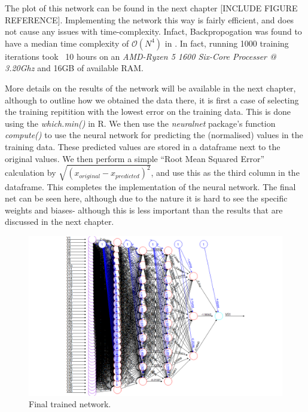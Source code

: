 The plot of this network can be found in the next chapter [INCLUDE FIGURE REFERENCE]. Implementing the network this way is fairly efficient, and does not cause any issues with time-complexity. Infact, Backpropogation 
was found to have a median time complexity of $\mathcal{O}(N^4)$ in \cite{lister}. In fact, running 1000 training iterations took ~10 hours on an \textit{AMD-Ryzen 5 1600 Six-Core Processer @ 3.20Ghz} and 16GB of available RAM.

More details on the results of the network will be available in the next chapter, although to outline how we obtained the data there, it is first a case of selecting the training repitition 
with the lowest error on the training data. This is done using the \textit{which.min()} in R. We then use the \textit{neuralnet} package's function 
\textit{compute()} to use the neural network for predicting the (normalised) values in the training data. These predicted values are stored in a dataframe next to 
the original values. We then perform a simple ``Root Mean Squared Error'' calculation by $\sqrt{(x_{original}-x_{predicted})^2}$, and use this as the third column in the dataframe. This completes the implementation of the neural 
network. The final net can be seen here, although due to the nature it is hard to see the specific weights and biases- although this is less important than the results that are discussed in the 
next chapter. 

\begin{figure}[h] 
    \includegraphics[scale=0.5]{figures/bestnet.png}
    \caption{Final trained network. }
\end{figure}